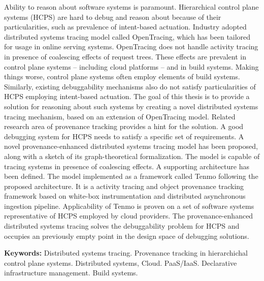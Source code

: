 Ability to reason about software systems is paramount. Hierarchical control plane systems (HCPS) are hard to debug and reason about because of their particularities, such as prevalence of intent-based actuation. Industry adopted distributed systems tracing model called OpenTracing, which has been tailored for usage in online serving systems. OpenTracing does not handle activity tracing in presence of coalescing effects of request trees. These effects are prevalent in control plane systems -- including cloud platforms -- and in build systems. Making things worse, control plane systems often employ elements of build systems. Similarly, existing debuggability mechanisms also do not satisfy particularities of HCPS employing intent-based actuation. The goal of this thesis is to provide a solution for reasoning about such systems by creating a novel distributed systems tracing mechanism, based on an extension of OpenTracing model. Related research area of provenance tracking provides a hint for the solution. A good debugging system for HCPS needs to satisfy a specific set of requirements. A novel provenance-enhanced distributed systems tracing model has been proposed, along with a sketch of its graph-theoretical formalization. The model is capable of tracing systems in presence of coalescing effects. A supporting architecture has been defined. The model implemented as a framework called Tenmo following the proposed architecture. It is a activity tracing and object provenance tracking framework based on white-box instrumentation and distributed asynchronous ingestion pipeline. Applicability of Tenmo is proven on a set of software systems representative of HCPS employed by cloud providers. The provenance-enhanced distributed systems tracing solves the debuggability problem for HCPS and occupies an previously empty point in the design space of debugging solutions.

\noindent \textbf{Keywords:} Distributed systems tracing. Provenance tracking in hierarchichal control plane systems. Distributed systems, Cloud. PaaS/IaaS. Declarative infrastructure management. Build systems.










